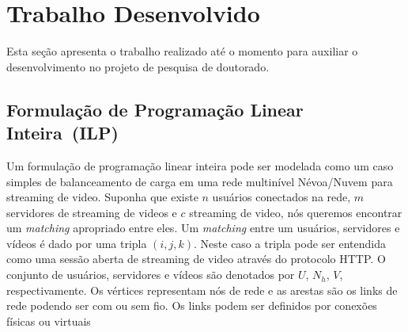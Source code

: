 \clearpage
\section{Trabalho Desenvolvido}
\label{ch:developed}

Esta seção apresenta o trabalho realizado até o momento para auxiliar o desenvolvimento 
no projeto de pesquisa de doutorado. 



%

\subsection{Formulação de Programação Linear Inteira~(ILP)}
\label{subsec:applications}

Um formulação de programação linear inteira pode ser modelada como um caso simples de balanceamento de carga em uma rede multinível Névoa/Nuvem para streaming de video.
Suponha que existe $n$ usuários conectados na rede, $m$ servidores de streaming de videos e $c$ streaming de video, nós queremos encontrar um \textit{matching} apropriado entre eles. Um \textit{matching} entre um usuários, servidores e vídeos é dado por uma tripla $(i,j,k)$. Neste caso a tripla pode ser entendida como uma sessão aberta de streaming de video através do protocolo HTTP. O conjunto de usuários, servidores e vídeos são denotados por $U$, $N_{h}$, $V$, respectivamente.
Os vértices representam nós de rede e as arestas são os links de rede podendo ser com ou sem fio. Os links podem ser definidos por conexões físicas ou virtuais


